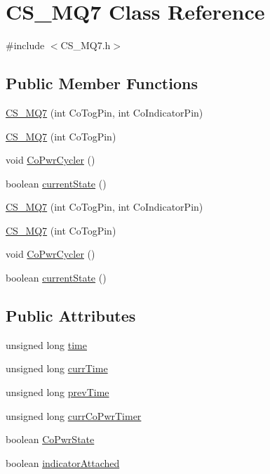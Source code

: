 \hypertarget{class_c_s___m_q7}{}\section{C\+S\+\_\+\+M\+Q7 Class Reference}
\label{class_c_s___m_q7}


{\ttfamily \#include $<$C\+S\+\_\+\+M\+Q7.\+h$>$}

\subsection*{Public Member Functions}
\begin{DoxyCompactItemize}
\item 
\hyperlink{class_c_s___m_q7_ae7482ce17ad2a9028b5ad90d4674354c}{C\+S\+\_\+\+M\+Q7} (int Co\+Tog\+Pin, int Co\+Indicator\+Pin)
\item 
\hyperlink{class_c_s___m_q7_a639eed7c5578c890b660f828510e4e0f}{C\+S\+\_\+\+M\+Q7} (int Co\+Tog\+Pin)
\item 
void \hyperlink{class_c_s___m_q7_a17c181ce1f6f898e2c7b0b40b2b1ba27}{Co\+Pwr\+Cycler} ()
\item 
boolean \hyperlink{class_c_s___m_q7_a93f3c2b248b3bc8427a83565e477a4e0}{current\+State} ()
\item 
\hyperlink{class_c_s___m_q7_ae7482ce17ad2a9028b5ad90d4674354c}{C\+S\+\_\+\+M\+Q7} (int Co\+Tog\+Pin, int Co\+Indicator\+Pin)
\item 
\hyperlink{class_c_s___m_q7_a639eed7c5578c890b660f828510e4e0f}{C\+S\+\_\+\+M\+Q7} (int Co\+Tog\+Pin)
\item 
void \hyperlink{class_c_s___m_q7_a17c181ce1f6f898e2c7b0b40b2b1ba27}{Co\+Pwr\+Cycler} ()
\item 
boolean \hyperlink{class_c_s___m_q7_a93f3c2b248b3bc8427a83565e477a4e0}{current\+State} ()
\end{DoxyCompactItemize}
\subsection*{Public Attributes}
\begin{DoxyCompactItemize}
\item 
unsigned long \hyperlink{class_c_s___m_q7_ada0bcce0de51abdcf9a4f4a4150d265a}{time}
\item 
unsigned long \hyperlink{class_c_s___m_q7_a70a66cdf74205698a597656cffedf178}{curr\+Time}
\item 
unsigned long \hyperlink{class_c_s___m_q7_a0e6e2f3cc2f904ada3e8ecb958b3f9b4}{prev\+Time}
\item 
unsigned long \hyperlink{class_c_s___m_q7_a7f2c5bf5755a7e28e8916df2626baef7}{curr\+Co\+Pwr\+Timer}
\item 
boolean \hyperlink{class_c_s___m_q7_ad924851e6f1298b59aec29eb1f965ac4}{Co\+Pwr\+State}
\item 
boolean \hyperlink{class_c_s___m_q7_aab84e4777cfe33a4b9d0651ac183f4e5}{indicator\+Attached}
\end{DoxyCompactItemize}


